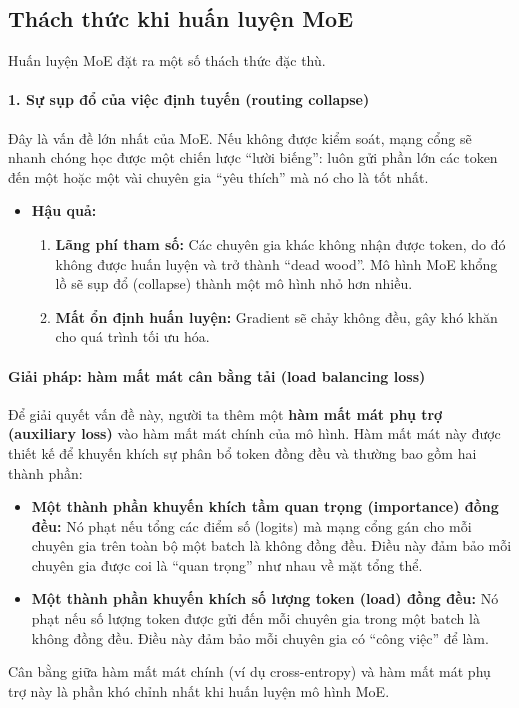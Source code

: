 \subsection{Thách thức khi huấn luyện MoE}
\label{ssec:moe_training_challenges}

Huấn luyện MoE đặt ra một số thách thức đặc thù.

\paragraph{1. Sự sụp đổ của việc định tuyến (routing collapse)}
Đây là vấn đề lớn nhất của MoE. Nếu không được kiểm soát, mạng cổng sẽ nhanh chóng học được một chiến lược “lười biếng”: luôn gửi phần lớn các token đến một hoặc một vài chuyên gia “yêu thích” mà nó cho là tốt nhất.
\begin{itemize}
    \item \textbf{Hậu quả:}
        \begin{enumerate}
            \item \textbf{Lãng phí tham số:} Các chuyên gia khác không nhận được token, do đó không được huấn luyện và trở thành “dead wood”. Mô hình MoE khổng lồ sẽ sụp đổ (collapse) thành một mô hình nhỏ hơn nhiều.
            \item \textbf{Mất ổn định huấn luyện:} Gradient sẽ chảy không đều, gây khó khăn cho quá trình tối ưu hóa.
        \end{enumerate}
\end{itemize}

\paragraph{Giải pháp: hàm mất mát cân bằng tải (load balancing loss)}
Để giải quyết vấn đề này, người ta thêm một \textbf{hàm mất mát phụ trợ (auxiliary loss)} vào hàm mất mát chính của mô hình. Hàm mất mát này được thiết kế để khuyến khích sự phân bổ token đồng đều và thường bao gồm hai thành phần:
\begin{itemize}
    \item \textbf{Một thành phần khuyến khích tầm quan trọng (importance) đồng đều:} Nó phạt nếu tổng các điểm số (logits) mà mạng cổng gán cho mỗi chuyên gia trên toàn bộ một batch là không đồng đều. Điều này đảm bảo mỗi chuyên gia được coi là “quan trọng” như nhau về mặt tổng thể.
    \item \textbf{Một thành phần khuyến khích số lượng token (load) đồng đều:} Nó phạt nếu số lượng token được gửi đến mỗi chuyên gia trong một batch là không đồng đều. Điều này đảm bảo mỗi chuyên gia có “công việc” để làm.
\end{itemize}
Cân bằng giữa hàm mất mát chính (ví dụ cross-entropy) và hàm mất mát phụ trợ này là phần khó chỉnh nhất khi huấn luyện mô hình MoE.

